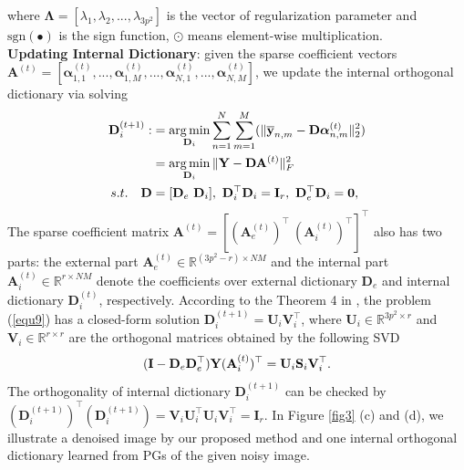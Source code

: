 \documentclass[10pt,twocolumn,letterpaper]{article}
\DeclareMathOperator*{\argmin}{arg\,min}
\begin{document}
where $\mathbf{\Lambda} = [\lambda_{1},\lambda_{2},...,\lambda_{3p^2}]$ is the vector of regularization parameter and $\text{sgn}(\bullet)$ is the sign function, $\odot$ means element-wise multiplication.
\\
\textbf{Updating Internal Dictionary}: given the sparse coefficient vectors $\textbf{A}^{(t)}=[\bm{\alpha}_{1,1}^{(t)},...,\bm{\alpha}_{1,M}^{(t)},...,\bm{\alpha}_{N,1}^{(t)},...,\bm{\alpha}_{N,M}^{(t)}]$, we update the internal orthogonal dictionary via solving
\vspace{-2mm}
\begin{equation}\label{equ9} \vspace{-2mm}
\begin{split}
\textbf{D}_{i}^{(t+1)}
:
&
=
\argmin_{\textbf{D}_{i}}
\sum_{n=1}^{N}\sum_{m=1}^{M}(\|\mathbf{\overline{y}}_{n,m}-\mathbf{D}\bm{\alpha}_{n,m}^{(t)}\|_{2}^{2})
\\
&
=
\argmin_{\textbf{D}_{i}}
\|\mathbf{Y}-\mathbf{D}\mathbf{A}^{(t)}\|_{F}^{2}
\\
s.t.
\quad
\mathbf{D}
&
=
[\mathbf{D}_{e}\ \mathbf{D}_{i}],\ \mathbf{D}_{i}^{\top}\mathbf{D}_{i} = \mathbf{I}_{r},\ \mathbf{D}_{e}^{\top}\mathbf{D}_{i} = \mathbf{0},
\end{split}
\end{equation}
The sparse coefficient matrix $\mathbf{A}^{(t)}=[(\mathbf{A}_{e}^{(t)})^{\top}\ (\mathbf{A}_{i}^{(t)})^{\top}]^{\top}$ also has two parts: the external part $\mathbf{A}_{e}^{(t)}\in\mathbb{R}^{(3p^2-r)\times NM}$ and the internal part $\mathbf{A}_{i}^{(t)}\in\mathbb{R}^{r\times NM}$ denote the coefficients over external dictionary $\mathbf{D}_{e}$ and internal dictionary $\mathbf{D}_{i}^{(t)}$, respectively. According to the Theorem 4 in \cite{spca}, the problem (\ref{equ9}) 
has a closed-form solution $\mathbf{D}_{i}^{(t+1)}=\mathbf{U}_{i}\mathbf{V}_{i}^{\top}$, where $\mathbf{U}_{i}\in\mathbb{R}^{3p^2\times r}$ and $\mathbf{V}_{i}\in\mathbb{R}^{r\times r}$ are the orthogonal matrices obtained by the following SVD
\vspace{-1mm}
\begin{equation}\label{equ10}\vspace{-2mm}
(\mathbf{I}-\mathbf{D}_{e}\mathbf{D}_{e}^{\top})\mathbf{Y}(\mathbf{A}_{i}^{(t)})^{\top}
=
\mathbf{U}_{i}\mathbf{S}_{i}\mathbf{V}_{i}^{\top}.
\end{equation}
The orthogonality of internal dictionary $\mathbf{D}_{i}^{(t+1)}$ can be checked by 
$(\mathbf{D}_{i}^{(t+1)})^{\top}(\mathbf{D}_{i}^{(t+1)})=\mathbf{V}_{i}\mathbf{U}_{i}^{\top}\mathbf{U}_{i}\mathbf{V}_{i}^{\top}=\mathbf{I}_{r}$. In Figure \ref{fig3} (c) and (d), we illustrate a denoised image by our proposed method and one internal orthogonal dictionary learned from PGs of the given noisy image.
\end{document}
